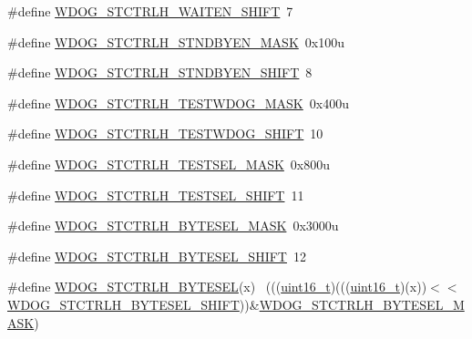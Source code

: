 \begin{DoxyCompactItemize}
\item 
\#define \hyperlink{group___w_d_o_g___register___masks_gad224b313777fd019f8ec46f1791a52b7}{W\+D\+O\+G\+\_\+\+S\+T\+C\+T\+R\+L\+H\+\_\+\+W\+A\+I\+T\+E\+N\+\_\+\+S\+H\+I\+FT}~7
\item 
\#define \hyperlink{group___w_d_o_g___register___masks_ga832d8fae2ced4b5168a7395fb8c48ebd}{W\+D\+O\+G\+\_\+\+S\+T\+C\+T\+R\+L\+H\+\_\+\+S\+T\+N\+D\+B\+Y\+E\+N\+\_\+\+M\+A\+SK}~0x100u
\item 
\#define \hyperlink{group___w_d_o_g___register___masks_ga18070b045357cfd09941cc6f9cdcc7ef}{W\+D\+O\+G\+\_\+\+S\+T\+C\+T\+R\+L\+H\+\_\+\+S\+T\+N\+D\+B\+Y\+E\+N\+\_\+\+S\+H\+I\+FT}~8
\item 
\#define \hyperlink{group___w_d_o_g___register___masks_ga155c6ba1a6269c937ad8a1e1500686aa}{W\+D\+O\+G\+\_\+\+S\+T\+C\+T\+R\+L\+H\+\_\+\+T\+E\+S\+T\+W\+D\+O\+G\+\_\+\+M\+A\+SK}~0x400u
\item 
\#define \hyperlink{group___w_d_o_g___register___masks_ga3b923179c1bd41abe9fbab0ee57740c0}{W\+D\+O\+G\+\_\+\+S\+T\+C\+T\+R\+L\+H\+\_\+\+T\+E\+S\+T\+W\+D\+O\+G\+\_\+\+S\+H\+I\+FT}~10
\item 
\#define \hyperlink{group___w_d_o_g___register___masks_gad8ac03c1a9c77ee59f938c243db30a42}{W\+D\+O\+G\+\_\+\+S\+T\+C\+T\+R\+L\+H\+\_\+\+T\+E\+S\+T\+S\+E\+L\+\_\+\+M\+A\+SK}~0x800u
\item 
\#define \hyperlink{group___w_d_o_g___register___masks_gaf41cdd95d386a6b663fa3adea03699e1}{W\+D\+O\+G\+\_\+\+S\+T\+C\+T\+R\+L\+H\+\_\+\+T\+E\+S\+T\+S\+E\+L\+\_\+\+S\+H\+I\+FT}~11
\item 
\#define \hyperlink{group___w_d_o_g___register___masks_ga20d3012eda5935f73ec4a9e24720fdc2}{W\+D\+O\+G\+\_\+\+S\+T\+C\+T\+R\+L\+H\+\_\+\+B\+Y\+T\+E\+S\+E\+L\+\_\+\+M\+A\+SK}~0x3000u
\item 
\#define \hyperlink{group___w_d_o_g___register___masks_ga0f73c2f0d56eac9caafc8a0337f95cc8}{W\+D\+O\+G\+\_\+\+S\+T\+C\+T\+R\+L\+H\+\_\+\+B\+Y\+T\+E\+S\+E\+L\+\_\+\+S\+H\+I\+FT}~12
\item 
\#define \hyperlink{group___w_d_o_g___register___masks_ga55e244387ea5a80b67dceb3e86af7160}{W\+D\+O\+G\+\_\+\+S\+T\+C\+T\+R\+L\+H\+\_\+\+B\+Y\+T\+E\+S\+EL}(x)                                ~(((\hyperlink{_p_e___types_8h_a1f1825b69244eb3ad2c7165ddc99c956}{uint16\+\_\+t})(((\hyperlink{_p_e___types_8h_a1f1825b69244eb3ad2c7165ddc99c956}{uint16\+\_\+t})(x))$<$$<$\hyperlink{group___w_d_o_g___register___masks_ga0f73c2f0d56eac9caafc8a0337f95cc8}{W\+D\+O\+G\+\_\+\+S\+T\+C\+T\+R\+L\+H\+\_\+\+B\+Y\+T\+E\+S\+E\+L\+\_\+\+S\+H\+I\+FT}))\&\hyperlink{group___w_d_o_g___register___masks_ga20d3012eda5935f73ec4a9e24720fdc2}{W\+D\+O\+G\+\_\+\+S\+T\+C\+T\+R\+L\+H\+\_\+\+B\+Y\+T\+E\+S\+E\+L\+\_\+\+M\+A\+SK})
$$
\end{DoxyCompactItemize}
